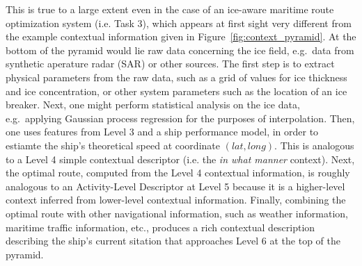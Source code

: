 This is true to a large extent even in the case of an ice-aware maritime route optimization system (i.e. Task 3), which appears at first sight very different from the example contextual information given in Figure~\ref{fig:context_pyramid}. At the bottom of the pyramid would lie raw data concerning the ice field, e.g.\ data from synthetic aperature radar (SAR) or other sources. The first step is to extract physical parameters from the raw data, such as a grid of values for ice thickness and ice concentration, or other system parameters such as the location of an ice breaker. Next, one might perform statistical analysis on the ice data, e.g.\ applying Gaussian process regression for the purposes of interpolation. Then, one uses features from Level 3 and a ship performance model, in order to estiamte the ship's theoretical speed at coordinate $(lat, long)$. This is analogous to a Level 4 simple contextual descriptor (i.e. the \emph{in what manner} context). Next, the optimal route, computed from the Level 4 contextual information, is roughly analogous to an Activity-Level Descriptor at Level 5 because it is a higher-level context inferred from lower-level contextual information. Finally, combining the optimal route with other navigational information, such as weather information, maritime traffic information, etc., produces a rich contextual description describing the ship's current sitation that approaches Level 6 at the top of the pyramid.
%

